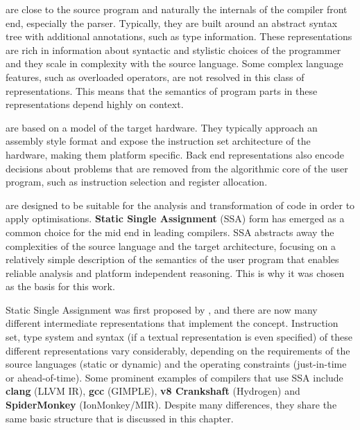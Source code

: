     \begin{description}[style=unboxed,leftmargin=0cm,labelindent=\parindent]
    \item[Front end representations] are close to the source program and
    naturally the internals of the compiler front end, especially the parser.
    Typically, they are built around an abstract syntax tree with
    additional annotations, such as type information.
    These representations are rich in information about syntactic and stylistic
    choices of the programmer and they scale in complexity with the source
    language.
    Some complex language features, such as overloaded operators, are not
    resolved in this class of representations.
    This means that the semantics of program parts in these representations
    depend highly on context.

    \item[\bf Back end representations] are based on a model of the target hardware.
    They typically approach an assembly style format and expose the instruction
    set architecture of the hardware, making them platform specific.
    Back end representations also encode decisions about problems that are
    removed from the algorithmic core of the user program, such as instruction
    selection and register allocation.

    \item[\bf Mid end representations] are designed to be suitable for the
    analysis and transformation of code in order to apply optimisations.
    {\bf Static Single Assignment} (SSA) form has emerged as a common choice for
    the mid end in leading compilers.
    SSA abstracts away the complexities of the source language and the
    target architecture, focusing on a relatively simple description of the
    semantics of the user program that enables reliable analysis and platform
    independent reasoning.
    This is why it was chosen as the basis for this work.
    \end{description}

    Static Single Assignment was first proposed by
    \citet{Rosen:1988:GVN:73560.73562}, and there are now many different
    intermediate representations that implement the concept.
    Instruction set, type system and syntax
    (if a textual representation is even specified) of these different
    representations vary
    considerably, depending on the requirements of the source languages
    (static or dynamic) and the operating constraints
    (just-in-time or ahead-of-time).
    Some prominent examples of compilers that use SSA include
    {\bf clang} (LLVM IR), {\bf gcc} (GIMPLE), {\bf v8 Crankshaft} (Hydrogen)
    and {\bf SpiderMonkey} (IonMonkey/MIR).
    Despite many differences, they share the same basic structure that is
    discussed in this chapter.

